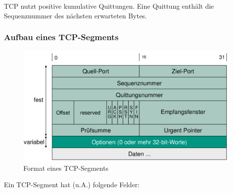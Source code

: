 \documentclass[a4paper, 14pt]{article}
\begin{document}
	TCP nutzt positive kumulative Quittungen.
	Eine Quittung enthält die Sequenznummer des nächsten erwarteten Bytes.

	\subsubsection{Aufbau eines TCP-Segments}

	\begin{figure}
		\begin{center}
			\includegraphics[width=\textwidth]{images/06-tcp-segment.png}
		\end{center}
		\caption{Format eines TCP-Segments}
	\end{figure}

	Ein TCP-Segment hat (u.A.) folgende Felder:
\end{document}
